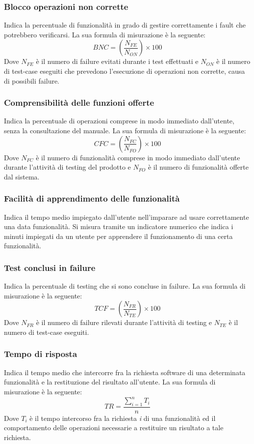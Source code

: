 		\subsubsection{Blocco operazioni non corrette} Indica la percentuale di funzionalità in grado di gestire correttamente i fault che potrebbero verificarsi. La sua formula di misurazione è la seguente:
\newline
		\[
		BNC=(\frac{N_{FE}}{N_{ON}}) \times 100
		\]	
		Dove $N_{FE}$ è il numero di failure evitati durante i test effettuati e $N_{ON}$ è il numero
di test-case eseguiti che prevedono l’esecuzione di operazioni non corrette, causa
		di possibili failure.
		\subsubsection{Comprensibilità delle funzioni offerte}
		Indica la percentuale di operazioni comprese in modo immediato dall'utente, senza la consultazione del manuale. La sua formula di misurazione è la seguente:
		\newline
		\[
		CFC=(\frac{N_{FC}}{N_{FO}}) \times 100
		\]	
		Dove $N_{FC}$ è il numero di funzionalità comprese in modo immediato dall'utente durante l’attività di testing del prodotto e $N_{FO}$ è il numero di funzionalità offerte dal sistema.
		\subsubsection{Facilità di apprendimento delle funzionalità}
		Indica il tempo medio impiegato dall'utente nell'imparare ad usare correttamente una data funzionalità. Si misura tramite un indicatore numerico che indica i minuti impiegati da un utente per apprendere il funzionamento di una certa funzionalità.
		\subsubsection{Test conclusi in failure} Indica la percentuale di testing che si sono concluse in failure. La sua formula di
misurazione è la seguente:
 \newline
		\[
		TCF=(\frac{N_{FR}}{N_{TE}}) \times 100
		\]	
		Dove $N_{FR}$ è il numero di failure rilevati durante l'attività di testing e $N_{TE}$
è il numero di test-case eseguiti.
		\subsubsection{Tempo di risposta} Indica il tempo medio che intercorre fra la richiesta software di una determinata
funzionalità e la restituzione del risultato all’utente. La sua formula di misurazione
è la seguente:\newline
		\[
		TR=\frac{\sum_{i=1}^{n}T_i}{n}
		\]	
		Dove $T_i$ è il tempo intercorso fra la richiesta \textit{i} di una funzionalità ed il comportamento delle operazioni necessarie a restituire un risultato a tale richiesta.

